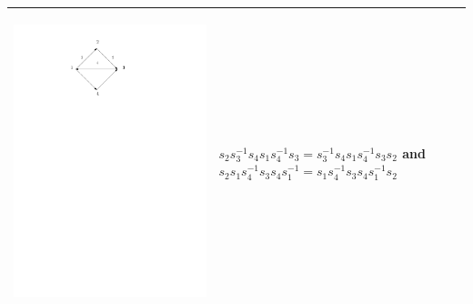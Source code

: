 \documentclass[11pt]{amsart}
\theoremstyle{definition}
\begin{document}
\begin{table}[h]
\begin{tabular}{| p{3.5cm} | p{7cm} |}
\begin{center}\includegraphics[scale = .30]{Diagram3.pdf}\end{center} & $s_{2}s_{3}^{-1}s_{4}s_{1}s_{4}^{-1}s_{3} = s_{3}^{-1}s_{4}s_{1}s_{4}^{-1}s_{3}s_{2}$ and
$s_{2}s_{1}s_{4}^{-1}s_{3}s_{4}s_{1}^{-1} = s_{1}s_{4}^{-1}s_{3}s_{4}s_{1}^{-1}s_{2}$\\ \hline


\end{tabular}
\end{table}
\end{document}
